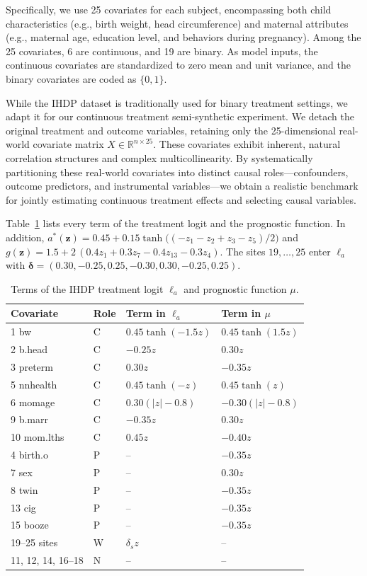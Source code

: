 \documentclass[twoside]{article}
\theoremstyle{plain}
\theoremstyle{definition}
\theoremstyle{remark}
\newtheorem{proof sketch}[theorem]{Proof Sketch}
\begin{document}
Specifically, we use 25 covariates for each subject, encompassing both child characteristics (e.g., birth weight, head circumference) and maternal attributes (e.g., maternal age, education level, and behaviors during pregnancy). Among the 25 covariates, 6 are continuous, and 19 are binary.  As model inputs, the continuous covariates are standardized to zero mean and unit variance, and the binary covariates are coded as $\{0, 1\}$. 

While the IHDP dataset is traditionally used for binary treatment settings, we adapt it for our continuous treatment semi-synthetic experiment. We detach the original treatment and outcome variables, retaining only the 25-dimensional real-world covariate matrix  $X \in \mathbb{R}^{n \times 25}$. These covariates exhibit inherent, natural correlation structures and complex multicollinearity. By systematically partitioning these real-world covariates into distinct causal roles—confounders, outcome predictors, and instrumental variables—we obtain a realistic benchmark for jointly estimating continuous treatment effects and selecting causal variables.

Table~\ref{tab:ihdp_dgp} lists every term of the treatment logit and the prognostic function. In addition,
$a^*(\mathbf{z}) = 0.45 + 0.15\tanh\big((-z_1 - z_2 + z_3 - z_5)/2\big)$ and
$g(\mathbf{z}) = 1.5 + 2\,(0.4 z_1 + 0.3 z_7 - 0.4 z_{13} - 0.3 z_4)$.
The sites $19,\ldots,25$ enter $\ell_a$ with $\boldsymbol{\delta}=(0.30,-0.25,0.25,-0.30,0.30,-0.25,0.25)$.

\begin{table}[h]
\centering
\small
\caption{Terms of the IHDP treatment logit $\ell_a$ and prognostic function $\mu$.}
\label{tab:ihdp_dgp}
\begin{tabular}{llll}
\toprule
Covariate & Role & Term in $\ell_a$ & Term in $\mu$ \\
\midrule
1 bw        & C & $0.45\tanh(-1.5z)$ & $0.45\tanh(1.5z)$ \\
2 b.head    & C & $-0.25z$ & $0.30z$ \\
3 preterm   & C & $0.30z$ & $-0.35z$ \\
5 nnhealth  & C & $0.45\tanh(-z)$ & $0.45\tanh(z)$ \\
6 momage    & C & $0.30(|z|-0.8)$ & $-0.30(|z|-0.8)$ \\
9 b.marr    & C & $-0.35z$ & $0.30z$ \\
10 mom.lths & C & $0.45z$ & $-0.40z$ \\
\midrule
4 birth.o   & P & -- & $-0.35z$ \\
7 sex       & P & -- & $0.30z$ \\
8 twin      & P & -- & $-0.35z$ \\
13 cig      & P & -- & $-0.35z$ \\
15 booze    & P & -- & $-0.35z$ \\
\midrule
19--25 sites & W & $\delta_s z$ & -- \\
11, 12, 14, 16--18 & N & -- & -- \\
\bottomrule
\end{tabular}
\end{table}
\end{document}
